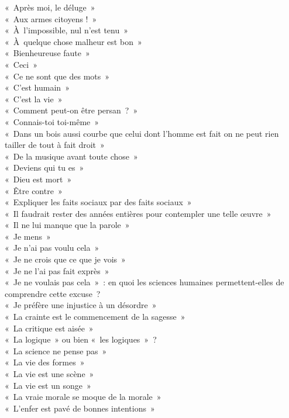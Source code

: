 \documentclass[a4paper,12pt]{article}
\begin{document}
« Après moi, le déluge » \\
« Aux armes citoyens ! » \\
« À l'impossible, nul n'est tenu » \\
« À quelque chose malheur est bon » \\
« Bienheureuse faute » \\
« Ceci » \\
« Ce ne sont que des mots » \\
« C'est humain » \\
« C'est la vie » \\
« Comment peut-on être persan ? » \\
« Connais-toi toi-même » \\
« Dans un bois aussi courbe que celui dont l'homme est fait on ne peut rien tailler de tout à fait droit » \\
« De la musique avant toute chose » \\
« Deviens qui tu es » \\
« Dieu est mort » \\
« Être contre » \\
« Expliquer les faits sociaux par des faits sociaux » \\
« Il faudrait rester des années entières pour contempler une telle œuvre » \\
« Il ne lui manque que la parole » \\
« Je mens » \\
« Je n'ai pas voulu cela » \\
« Je ne crois que ce que je vois » \\
« Je ne l'ai pas fait exprès » \\
« Je ne voulais pas cela » : en quoi les sciences humaines permettent-elles de comprendre cette excuse ? \\
« Je préfère une injustice à un désordre » \\
« La crainte est le commencement de la sagesse » \\
« La critique est aisée » \\
« La logique » ou bien « les logiques » ? \\
« La science ne pense pas » \\
« La vie des formes » \\
« La vie est une scène » \\
« La vie est un songe » \\
« La vraie morale se moque de la morale » \\
« L'enfer est pavé de bonnes intentions » \\
\end{document}
